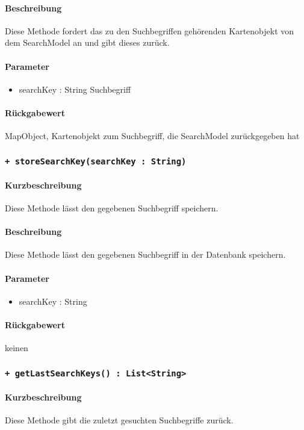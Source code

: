 \paragraph*{Beschreibung}
Diese Methode fordert das zu den Suchbegriffen gehörenden Kartenobjekt von dem SearchModel an und gibt dieses zurück.
\paragraph*{Parameter}
\begin{itemize}
    \item searchKey : String Suchbegriff
\end{itemize}
\paragraph*{Rückgabewert}
MapObject, Kartenobjekt zum Suchbegriff, die SearchModel zurückgegeben hat

\subsubsection{\texttt{+ storeSearchKey(searchKey : String)}}%
\paragraph*{Kurzbeschreibung}
Diese Methode lässt den gegebenen Suchbegriff speichern.
\paragraph*{Beschreibung}
Diese Methode lässt den gegebenen Suchbegriff in der Datenbank speichern.
\paragraph*{Parameter}
\begin{itemize}
    \item searchKey : String
\end{itemize}
\paragraph*{Rückgabewert}
keinen

\subsubsection{\texttt{+ getLastSearchKeys() : List<String>}}%
\paragraph*{Kurzbeschreibung}
Diese Methode gibt die zuletzt gesuchten Suchbegriffe zurück.
